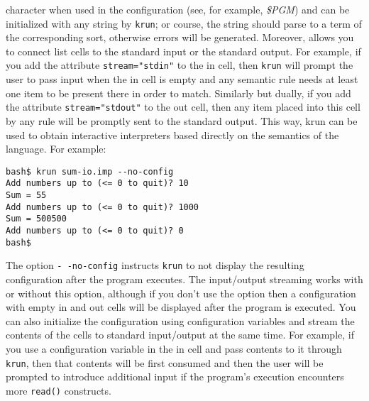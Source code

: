 \documentclass{article}
\begin{document}
\begin{kdefinition}
\begin{module}{}
\begin{kblock}[text]
character when used in the configuration (see, for example,
\textit{\$PGM}) and can be initialized with any string by
\texttt{krun}; or course, the string should parse to a term of the
corresponding sort, otherwise errors will be generated.
Moreover, \K allows you to connect list cells to the standard input or
the standard output.  For example, if you add the attribute
\texttt{stream="stdin"} to the \textsf{in} cell, then \texttt{krun}
will prompt the user to pass input when the \textsf{in} cell is empty
and any semantic rule needs at least one item to be present there in
order to match.  Similarly but dually, if you add the attribute
\texttt{stream="stdout"} to the \textsf{out} cell, then any item
placed into this cell by any rule will be promptly sent to the
standard output.  This way, \textsf{krun} can be used to obtain
interactive interpreters based directly on the \K semantics of the
language.  For example:
\begin{verbatim}
bash$ krun sum-io.imp --no-config
Add numbers up to (<= 0 to quit)? 10
Sum = 55
Add numbers up to (<= 0 to quit)? 1000
Sum = 500500
Add numbers up to (<= 0 to quit)? 0
bash$ 
\end{verbatim}
The option \texttt{-\,\!-no-config} instructs \texttt{krun} to not
display the resulting configuration after the program executes.  The
input/output streaming works with or without this option, although
if you don't use the option then a configuration with empty
\textsf{in} and \textsf{out} cells will be displayed after the program
is executed.  You can also initialize the configuration using
configuration variables and stream the contents of the cells to
standard input/output at the same time.  For example, if you use a
configuration variable in the \textsf{in} cell and pass contents to it
through \texttt{krun}, then that contents will be first consumed and
then the user will be prompted to introduce additional input if the
program's execution encounters more \texttt{read()} constructs. \end{kblock}
\begin{kblock}[text]

\end{kblock}
\end{module}
\end{kdefinition}
\end{document}
